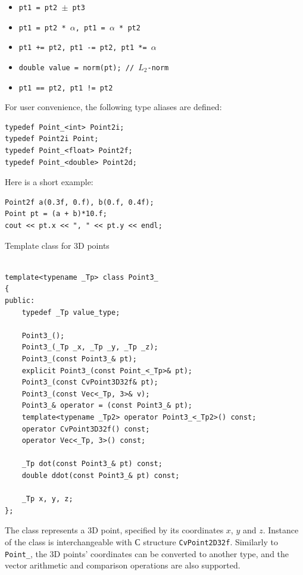\begin{itemize}
    \item \texttt{pt1 = pt2 $\pm$ pt3}
    \item \texttt{pt1 = pt2 * $\alpha$, pt1 = $\alpha$ * pt2}
    \item \texttt{pt1 += pt2, pt1 -= pt2, pt1 *= $\alpha$}
    \item \texttt{double value = norm(pt); // $L_2$-norm}
    \item \texttt{pt1 == pt2, pt1 != pt2}    
\end{itemize}

For user convenience, the following type aliases are defined:
\begin{lstlisting}
typedef Point_<int> Point2i;
typedef Point2i Point;
typedef Point_<float> Point2f;
typedef Point_<double> Point2d;
\end{lstlisting}

Here is a short example:
\begin{lstlisting}
Point2f a(0.3f, 0.f), b(0.f, 0.4f);
Point pt = (a + b)*10.f;
cout << pt.x << ", " << pt.y << endl; 
\end{lstlisting}


Template class for 3D points

\begin{lstlisting}

template<typename _Tp> class Point3_
{
public:
    typedef _Tp value_type;
    
    Point3_();
    Point3_(_Tp _x, _Tp _y, _Tp _z);
    Point3_(const Point3_& pt);
    explicit Point3_(const Point_<_Tp>& pt);
    Point3_(const CvPoint3D32f& pt);
    Point3_(const Vec<_Tp, 3>& v);
    Point3_& operator = (const Point3_& pt);
    template<typename _Tp2> operator Point3_<_Tp2>() const;
    operator CvPoint3D32f() const;
    operator Vec<_Tp, 3>() const;

    _Tp dot(const Point3_& pt) const;
    double ddot(const Point3_& pt) const;
    
    _Tp x, y, z;
};
\end{lstlisting}

The class represents a 3D point, specified by its coordinates $x$, $y$ and $z$.
Instance of the class is interchangeable with С structure \texttt{CvPoint2D32f}. Similarly to \texttt{Point\_}, the 3D points' coordinates can be converted to another type, and the vector arithmetic and comparison operations are also supported.

